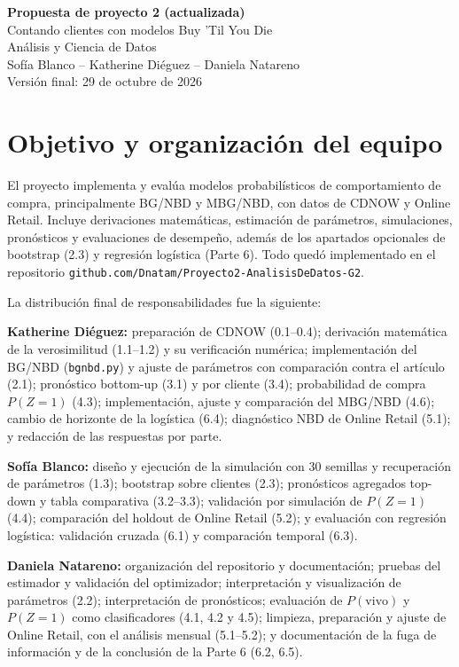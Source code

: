 \documentclass[11pt,a4paper]{article}
\begin{document}
\begin{center}
{\LARGE\bfseries Propuesta de proyecto 2 (actualizada)}\\[4pt]
{\large Contando clientes con modelos Buy 'Til You Die}\\[4pt]
Análisis y Ciencia de Datos\\[2pt]
Sofía Blanco -- Katherine Diéguez -- Daniela Natareno\\[2pt]
{\small Versión final: 29 de octubre de 2026}
\end{center}

\section*{Objetivo y organización del equipo}
El proyecto implementa y evalúa modelos probabilísticos de comportamiento de compra, principalmente BG/NBD y MBG/NBD, con datos de CDNOW y Online Retail. Incluye derivaciones matemáticas, estimación de parámetros, simulaciones, pronósticos y evaluaciones de desempeño, además de los apartados opcionales de bootstrap (2.3) y regresión logística (Parte 6). Todo quedó implementado en el repositorio \texttt{github.com/Dnatam/Proyecto2-AnalisisDeDatos-G2}.

La distribución final de responsabilidades fue la siguiente:

\textbf{Katherine Diéguez:} preparación de CDNOW (0.1–0.4); derivación matemática de la verosimilitud (1.1–1.2) y su verificación numérica; implementación del BG/NBD (\texttt{bgnbd.py}) y ajuste de parámetros con comparación contra el artículo (2.1); pronóstico bottom-up (3.1) y por cliente (3.4); probabilidad de compra $P(Z=1)$ (4.3); implementación, ajuste y comparación del MBG/NBD (4.6); cambio de horizonte de la logística (6.4); diagnóstico NBD de Online Retail (5.1); y redacción de las respuestas por parte.

\textbf{Sofía Blanco:} diseño y ejecución de la simulación con 30 semillas y recuperación de parámetros (1.3); bootstrap sobre clientes (2.3); pronósticos agregados top-down y tabla comparativa (3.2–3.3); validación por simulación de $P(Z=1)$ (4.4); comparación del holdout de Online Retail (5.2); y evaluación con regresión logística: validación cruzada (6.1) y comparación temporal (6.3).

\textbf{Daniela Natareno:} organización del repositorio y documentación; pruebas del estimador y validación del optimizador; interpretación y visualización de parámetros (2.2); interpretación de pronósticos; evaluación de $P(\text{vivo})$ y $P(Z=1)$ como clasificadores (4.1, 4.2 y 4.5); limpieza, preparación y ajuste de Online Retail, con el análisis mensual (5.1–5.2); y documentación de la fuga de información y de la conclusión de la Parte 6 (6.2, 6.5).
\end{document}
